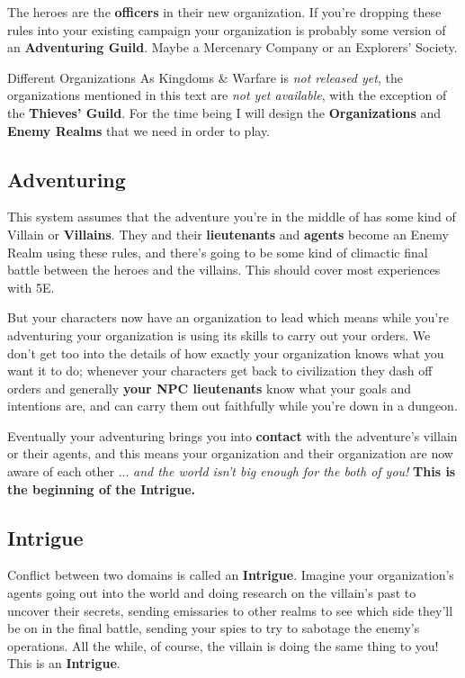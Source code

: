 \documentclass[letterpaper,twocolumn,openany,nodeprecatedcode]{dndbook}
\begin{document}
The heroes are the \textbf{officers} in their new organization.
If you’re dropping these rules into your existing campaign your organization is probably some version of an \textbf{Adventuring Guild}.
Maybe a Mercenary Company or an Explorers’ Society.

\begin{DndSidebar}{Different Organizations}
  As Kingdoms \& Warfare is \textit{not released yet}, the organizations mentioned in this text are \textit{not yet available}, with the exception of the \textbf{Thieves’ Guild}.
  For the time being I will design the \textbf{Organizations} and \textbf{Enemy Realms} that we need in order to play.
\end{DndSidebar}

\subsection{Adventuring}

This system assumes that the adventure you’re in the middle of has some kind of Villain or \textbf{Villains}.
They and their \textbf{lieutenants} and \textbf{agents} become an Enemy Realm using these rules, and there’s going to be some kind of climactic final battle between the heroes and the villains.
This should cover most experiences with 5E.

But your characters now have an organization to lead which means while you’re adventuring your organization is using its skills to carry out your orders.
We don’t get too into the details of how exactly your organization knows what you want it to do; whenever your characters get back to civilization they dash off orders and generally \textbf{your NPC lieutenants} know what your goals and intentions are, and can carry them out faithfully while you’re down in a dungeon.

Eventually your adventuring brings you into \textbf{contact} with the adventure’s villain or their agents, and this means your organization and their organization are now aware of each other ... \textit{and the world isn’t big enough for the both of you!}
\textbf{This is the beginning of the Intrigue.}

\subsection{Intrigue}

Conflict between two domains is called an \textbf{Intrigue}.
Imagine your organization’s agents going out into the world and doing research on the villain’s past to uncover their secrets, sending emissaries to other realms to see which side they’ll be on in the final battle, sending your spies to try to sabotage the enemy’s operations.
All the while, of course, the villain is doing the same thing to you!
This is an \textbf{Intrigue}.
\end{document}
